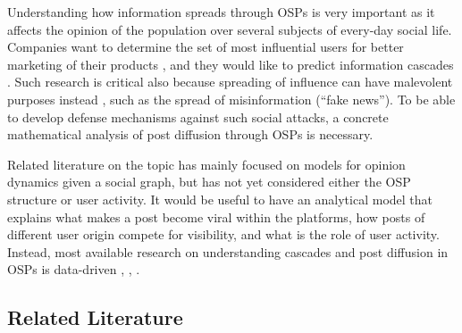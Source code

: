 \documentclass[10pt, conference, letterpaper]{IEEEtran}
\begin{document}
Understanding how information spreads through OSPs is very important as it affects the opinion of the population over several subjects of every-day social life. %
Companies want to determine the set of most influential users for better marketing of their products \cite{Kempe03}, and they would like to predict information cascades \cite{LescovecPredict}. Such research is critical also because spreading of influence can have malevolent purposes instead \cite{FakeNewsPaper18}, such as the spread of misinformation (``fake news''). %
To be able to develop defense mechanisms against such social attacks, a concrete mathematical analysis of post diffusion through OSPs is necessary.

Related literature on the topic has mainly focused on models for opinion dynamics given a social graph, but has not yet considered either the OSP structure or user activity. It would be useful to have an analytical model that explains what makes a post become viral within the platforms, how posts of different user origin compete for visibility, and what is the role of user activity. Instead, most available research on understanding cascades and post diffusion in OSPs is data-driven \cite{EC2012}, \cite{Adamic2013},  \cite{LescovecPredict}.



\subsection{Related Literature}
\end{document}
